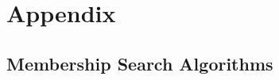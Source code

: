 \appendix

\section{Appendix}\label{section:appendices}

\subsection{Membership Search Algorithms}

















